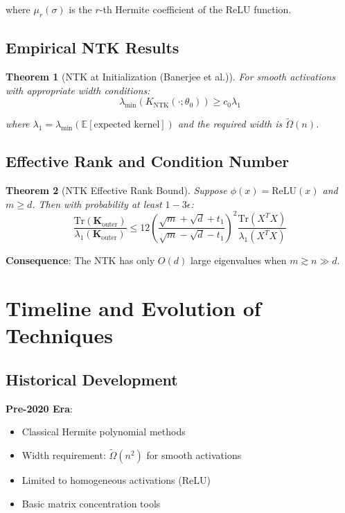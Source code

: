 \documentclass{article}
\newtheorem{theorem}{Theorem}[section]
\newcommand{\E}{\mathbb{E}}
\newcommand{\KNTK}{K_{\text{NTK}}}
\newcommand{\lambdaMin}{\lambda_{\min}}
\newcommand{\TildeOmega}{\tilde{\Omega}}
\begin{document}
where $\mu_r(\sigma)$ is the $r$-th Hermite coefficient of the ReLU function.

\subsection{Empirical NTK Results}

\begin{theorem}[NTK at Initialization (Banerjee et al.)]
For smooth activations with appropriate width conditions:
$$\lambdaMin(\KNTK(\cdot;\theta_0)) \geq c_0 \lambda_1$$

where $\lambda_1 = \lambdaMin(\E[\text{expected kernel}])$ and the required width is $\TildeOmega(n)$.
\end{theorem}

\subsection{Effective Rank and Condition Number}

\begin{theorem}[NTK Effective Rank Bound]
Suppose $\phi(x) = \text{ReLU}(x)$ and $m \geq d$. Then with probability at least $1 - 3\epsilon$:
$$\frac{\text{Tr}(\mathbf{K}_{\text{outer}})}{\lambda_1(\mathbf{K}_{\text{outer}})} \leq 12 \left(\frac{\sqrt{m} + \sqrt{d} + t_1}{\sqrt{m} - \sqrt{d} - t_1}\right)^2 \frac{\text{Tr}(X^T X)}{\lambda_1(X^T X)}$$
\end{theorem}

\textbf{Consequence}: The NTK has only $O(d)$ large eigenvalues when $m \gtrsim n \gg d$.

\section{Timeline and Evolution of Techniques}

\subsection{Historical Development}

\textbf{Pre-2020 Era}:
\begin{itemize}
    \item Classical Hermite polynomial methods
    \item Width requirement: $\TildeOmega(n^2)$ for smooth activations
    \item Limited to homogeneous activations (ReLU)
    \item Basic matrix concentration tools
\end{itemize}
\end{document}
